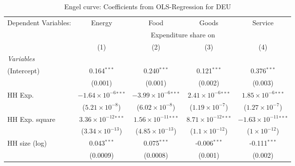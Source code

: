 
\begin{table}[htbp!]
   \centering
   \small
   \begin{adjustbox}{width = 1\textwidth, max height = 0.95\textheight, center}
      \begin{threeparttable}[b]
         \caption{\label{tab:Engel_parametric_DEU} Engel curve: Coefficients from OLS-Regression for DEU}
         \begin{tabular}{lcccc}
            \tabularnewline \midrule \midrule
            Dependent Variables: & Energy                         & Food                           & Goods                          & Service\\  
             & \multicolumn{4}{c}{Expenditure share on} \\ 
                                 & (1)                            & (2)                            & (3)                            & (4)\\  
            \midrule
            \emph{Variables}\\
            (Intercept)          & 0.164$^{***}$                  & 0.240$^{***}$                  & 0.121$^{***}$                  & 0.376$^{***}$\\   
                                 & (0.001)                        & (0.001)                        & (0.002)                        & (0.003)\\   
            HH Exp.              & $-1.64\times 10^{-6}$$^{***}$  & $-3.99\times 10^{-6}$$^{***}$  & $2.41\times 10^{-6}$$^{***}$   & $1.85\times 10^{-6}$$^{***}$\\    
                                 & ($5.21\times 10^{-8}$)         & ($6.02\times 10^{-8}$)         & ($1.19\times 10^{-7}$)         & ($1.27\times 10^{-7}$)\\    
            HH Exp. square       & $3.36\times 10^{-12}$$^{***}$  & $1.56\times 10^{-11}$$^{***}$  & $8.71\times 10^{-12}$$^{***}$  & $-1.63\times 10^{-11}$$^{***}$\\    
                                 & ($3.34\times 10^{-13}$)        & ($4.85\times 10^{-13}$)        & ($1.1\times 10^{-12}$)         & ($1\times 10^{-12}$)\\    
            HH size (log)        & 0.043$^{***}$                  & 0.075$^{***}$                  & -0.006$^{***}$                 & -0.111$^{***}$\\   
                                 & (0.0009)                       & (0.0008)                       & (0.001)                        & (0.002)\\   

\end{tabular}
\end{threeparttable}
\end{adjustbox}
\end{table}

